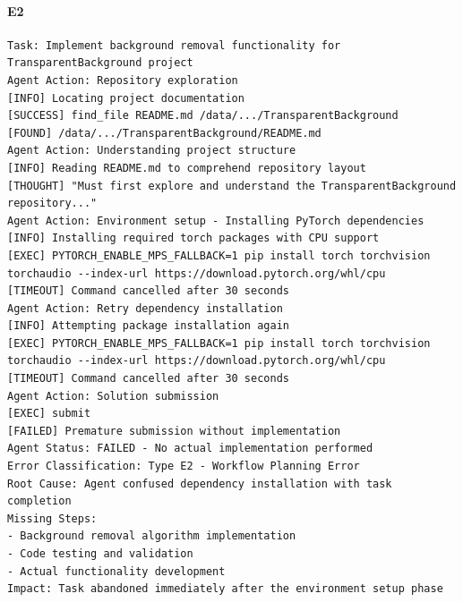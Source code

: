 \paragraph{E2}
\begin{lstlisting}[language={},caption={TransparentBackground implementation failed due to premature submission after dependency installation.},label={lst:transparent-background-workflow}]
Task: Implement background removal functionality for TransparentBackground project
Agent Action: Repository exploration
[INFO] Locating project documentation
[SUCCESS] find_file README.md /data/.../TransparentBackground
[FOUND] /data/.../TransparentBackground/README.md
Agent Action: Understanding project structure
[INFO] Reading README.md to comprehend repository layout
[THOUGHT] "Must first explore and understand the TransparentBackground repository..."
Agent Action: Environment setup - Installing PyTorch dependencies
[INFO] Installing required torch packages with CPU support
[EXEC] PYTORCH_ENABLE_MPS_FALLBACK=1 pip install torch torchvision torchaudio --index-url https://download.pytorch.org/whl/cpu
[TIMEOUT] Command cancelled after 30 seconds
Agent Action: Retry dependency installation
[INFO] Attempting package installation again
[EXEC] PYTORCH_ENABLE_MPS_FALLBACK=1 pip install torch torchvision torchaudio --index-url https://download.pytorch.org/whl/cpu
[TIMEOUT] Command cancelled after 30 seconds
Agent Action: Solution submission
[EXEC] submit
[FAILED] Premature submission without implementation
Agent Status: FAILED - No actual implementation performed
Error Classification: Type E2 - Workflow Planning Error
Root Cause: Agent confused dependency installation with task completion
Missing Steps: 
- Background removal algorithm implementation
- Code testing and validation
- Actual functionality development
Impact: Task abandoned immediately after the environment setup phase
\end{lstlisting}


